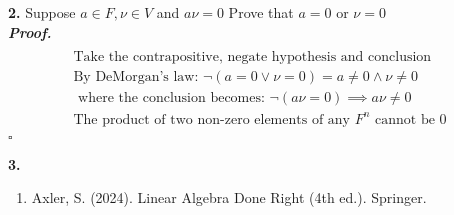 \documentclass[12pt]{article} %
\newenvironment{solution}[1][\it{Proof}]{\textbf{#1. } }{$\square$}
\begin{document}
\textbf{2. } Suppose $a \in F, \nu \in V$ and $a\nu = 0$ Prove that $a = 0$ or $\nu = 0$ \\ 

\begin{solution}
\begin{align*}  \\
\text{Take the contrapositive, negate hypothesis and conclusion} \\
\text{By DeMorgan's law: } \neg(a=0 \lor \nu=0) = a\ne{0} \wedge \nu \ne 0  \\
\text{ where the conclusion becomes: } \neg(a\nu = 0) \implies a\nu\ne0\\
\text{The product of two non-zero elements of any } F^{n} \text{ cannot be 0} \\
\end{align*}
\end{solution}

\textbf{3. } 















\newpage


\begin{enumerate}
    \item Axler, S. (2024). Linear Algebra Done Right (4th ed.). Springer.
\end{enumerate}
\end{document}
